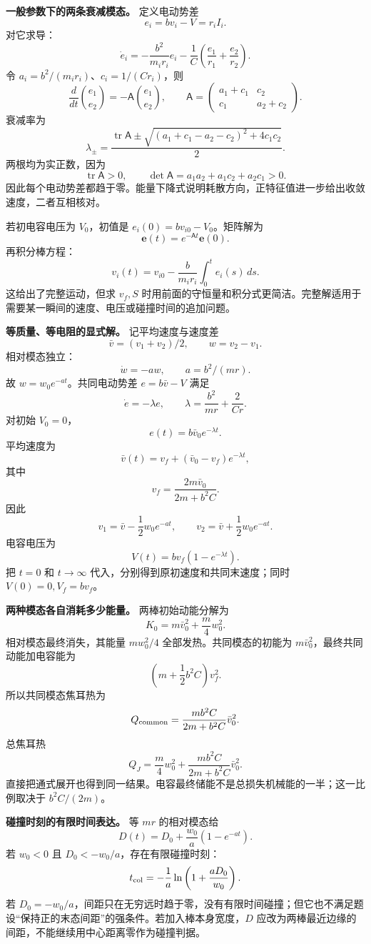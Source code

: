 \documentclass[12pt,a4paper,UTF8]{ctexart}
\begin{document}
\textbf{一般参数下的两条衰减模态。} 定义电动势差 \[
e_i=bv_i-V=r_iI_i.
\] 对它求导： \[
\dot e_i=-\frac{b^2}{m_ir_i}e_i
-\frac1C\left(\frac{e_1}{r_1}+\frac{e_2}{r_2}\right).
\] 令 \(a_i=b^2/(m_ir_i)\)、\(c_i=1/(Cr_i)\)，则 \[
\frac d{dt}\binom{e_1}{e_2}
=-\mathsf A\binom{e_1}{e_2},\qquad
\mathsf A=
\begin{pmatrix}
a_1+c_1&c_2\\
c_1&a_2+c_2
\end{pmatrix}.
\] 衰减率为 \[
\lambda_\pm=
\frac{\operatorname{tr}\mathsf A
\pm\sqrt{(a_1+c_1-a_2-c_2)^2+4c_1c_2}}2.
\] 两根均为实正数，因为 \[
\operatorname{tr}\mathsf A>0,\qquad
\det\mathsf A=a_1a_2+a_1c_2+a_2c_1>0.
\]
因此每个电动势差都趋于零。能量下降式说明耗散方向，正特征值进一步给出收敛速度，二者互相核对。

若初电容电压为 \(V_0\)，初值是 \(e_i(0)=bv_{i0}-V_0\)。矩阵解为 \[
\boldsymbol e(t)=e^{-\mathsf A t}\boldsymbol e(0).
\] 再积分棒方程： \[
v_i(t)=v_{i0}-\frac b{m_ir_i}\int_0^te_i(s)\,ds.
\] 这给出了完整运动，但求 \(v_f,S\)
时用前面的守恒量和积分式更简洁。完整解适用于需要某一瞬间的速度、电压或碰撞时间的追加问题。

\textbf{等质量、等电阻的显式解。} 记平均速度与速度差 \[
\bar v=(v_1+v_2)/2,\qquad w=v_2-v_1.
\] 相对模态独立： \[
\dot w=-a w,\qquad a=b^2/(mr).
\] 故 \(w=w_0e^{-at}\)。共同电动势差 \(e=b\bar v-V\) 满足 \[
\dot e=-\lambda e,\qquad
\lambda=\frac{b^2}{mr}+\frac2{Cr}.
\] 对初始 \(V_0=0\)， \[
e(t)=b\bar v_0e^{-\lambda t}.
\] 平均速度为 \[
\bar v(t)=v_f+(\bar v_0-v_f)e^{-\lambda t},
\] 其中 \[
v_f=\frac{2m\bar v_0}{2m+b^2C}.
\] 因此 \[
v_1=\bar v-\frac12w_0e^{-at},\qquad
v_2=\bar v+\frac12w_0e^{-at}.
\] 电容电压为 \[
V(t)=bv_f(1-e^{-\lambda t}).
\] 把 \(t=0\) 和 \(t\to\infty\) 代入，分别得到原初速度和共同末速度；同时
\(V(0)=0,V_f=bv_f\)。

\textbf{两种模态各自消耗多少能量。} 两棒初始动能分解为 \[
K_0=m\bar v_0^2+\frac m4w_0^2.
\] 相对模态最终消失，其能量 \(mw_0^2/4\) 全部发热。共同模态的初能为
\(m\bar v_0^2\)，最终共同动能加电容能为 \[
\left(m+\frac12b^2C\right)v_f^2.
\] 所以共同模态焦耳热为 \[
Q_{\rm common}
=\frac{mb^2C}{2m+b^2C}\bar v_0^2.
\] 总焦耳热 \[
\boxed{Q_J=\frac m4w_0^2+
\frac{mb^2C}{2m+b^2C}\bar v_0^2}.
\]
直接把通式展开也得到同一结果。电容最终储能不是总损失机械能的一半；这一比例取决于
\(b^2C/(2m)\)。

\textbf{碰撞时刻的有限时间表达。} 等 \(mr\) 的相对模态给 \[
D(t)=D_0+\frac{w_0}{a}(1-e^{-at}).
\] 若 \(w_0<0\) 且 \(D_0<-w_0/a\)，存在有限碰撞时刻： \[
t_{\rm col}=
-\frac1a\ln\left(1+\frac{aD_0}{w_0}\right).
\] 若
\(D_0=-w_0/a\)，间距只在无穷远时趋于零，没有有限时间碰撞；但它也不满足题设``保持正的末态间距''的强条件。若加入棒本身宽度，\(D\)
应改为两棒最近边缘的间距，不能继续用中心距离零作为碰撞判据。
\end{document}
